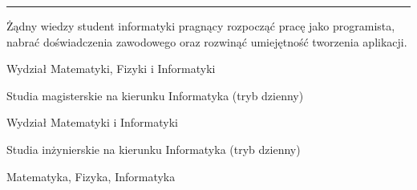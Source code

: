 \documentclass[11pt,a4paper]{article}
\begin{document}
    \noindent\rule{\textwidth}{0.4pt}
  
  
    \vspace{0.4cm}
  
    \smallskip
    \noindent
    Żądny wiedzy student informatyki pragnący rozpocząć pracę jako programista,\linebreak
    nabrać doświadczenia zawodowego oraz rozwinąć umiejętność tworzenia aplikacji.
  
  
    \vspace{0.5cm}
  
    \medskip
    \vspace{-1.6mm}
    \begin{description} \itemsep0pt \parskip0pt 
        \item[ ] Wydział Matematyki, Fizyki i Informatyki
        \item[ ] Studia magisterskie na kierunku Informatyka (tryb dzienny)
    \end{description}
  
    \vspace{-1.6mm}
    \begin{description} \itemsep0pt \parskip0pt 
        \item[ ] Wydział Matematyki i Informatyki
        \item[ ] Studia inżynierskie na kierunku Informatyka (tryb dzienny)
    \end{description}
  
    \vspace{-1.6mm}
    \begin{description} \itemsep0pt \parskip0pt 
        \item[ ] Matematyka, Fizyka, Informatyka
    \end{description}
  
  
\end{document}
